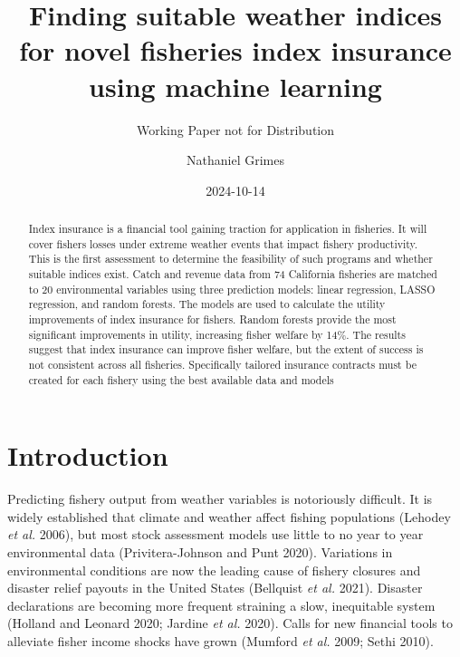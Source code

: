 \documentclass[
  letterpaper,
  DIV=11,
  numbers=noendperiod]{scrartcl}
\title{Finding suitable weather indices for novel fisheries index
insurance using machine learning}
\subtitle{Working Paper not for Distribution}
\author{Nathaniel Grimes}
\date{2024-10-14}
\renewcommand*\contentsname{Table of contents}
\newcommand\contentsname{Table of contents}
\begin{document}
\maketitle
\begin{abstract}
Index insurance is a financial tool gaining traction for application in
fisheries. It will cover fishers losses under extreme weather events
that impact fishery productivity. This is the first assessment to
determine the feasibility of such programs and whether suitable indices
exist. Catch and revenue data from 74 California fisheries are matched
to 20 environmental variables using three prediction models: linear
regression, LASSO regression, and random forests. The models are used to
calculate the utility improvements of index insurance for fishers.
Random forests provide the most significant improvements in utility,
increasing fisher welfare by 14\%. The results suggest that index
insurance can improve fisher welfare, but the extent of success is not
consistent across all fisheries. Specifically tailored insurance
contracts must be created for each fishery using the best available data
and models
\end{abstract}
\ifdefined\Shaded\renewenvironment{Shaded}{\begin{tcolorbox}[breakable, borderline west={3pt}{0pt}{shadecolor}, boxrule=0pt, enhanced, frame hidden, interior hidden, sharp corners]}{\end{tcolorbox}}\fi

\renewcommand*\contentsname{Table of contents}
{
\hypersetup{linkcolor=}
\setcounter{tocdepth}{3}
\tableofcontents
}
\hypertarget{introduction}{%
\section{Introduction}\label{introduction}}

Predicting fishery output from weather variables is notoriously
difficult. It is widely established that climate and weather affect
fishing populations (Lehodey \emph{et al.} 2006), but most stock
assessment models use little to no year to year environmental data
(Privitera-Johnson and Punt 2020). Variations in environmental
conditions are now the leading cause of fishery closures and disaster
relief payouts in the United States (Bellquist \emph{et al.} 2021).
Disaster declarations are becoming more frequent straining a slow,
inequitable system (Holland and Leonard 2020; Jardine \emph{et al.}
2020). Calls for new financial tools to alleviate fisher income shocks
have grown (Mumford \emph{et al.} 2009; Sethi 2010).
\end{document}
